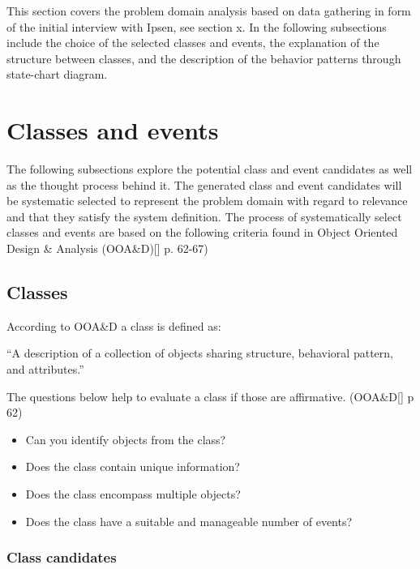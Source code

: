 This section covers the problem domain analysis based on data gathering in form of the initial interview with Ipsen, see section x. In the following subsections include the choice of the selected classes and events, the explanation of the structure between classes, and the description of the behavior patterns through state-chart diagram. 

\section{Classes and events}

The following subsections explore the potential class and event candidates as well as the thought process behind it. The generated class and event candidates will be systematic selected to represent the problem domain with regard to relevance and that they satisfy the system definition. The process of systematically select classes and events are based on the following criteria found in Object Oriented Design \& Analysis (OOA\&D)[] p. 62-67)

\subsection{Classes}
According to OOA\&D a class is defined as:

“A description of a collection of objects sharing structure, behavioral pattern, and attributes.”

The questions below help to evaluate a class if those are affirmative. (OOA\&D[] p 62)

\begin{itemize}
	\item Can you identify objects from the class?
	\item Does the class contain unique information?
	\item Does the class encompass multiple objects?
	\item Does the class have a suitable and manageable number of events?
\end{itemize}

\subsubsection{Class candidates}



